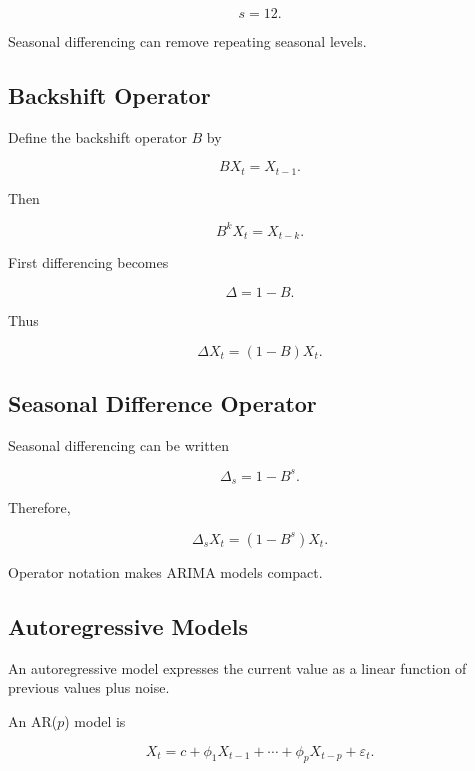 \[
\boxed{
s=12.
}
\]

Seasonal differencing can remove repeating seasonal levels.

\subsection{Backshift Operator}
\label{subsec:backshift-operator}

Define the backshift operator \(B\) by

\[
\boxed{
BX_t
=
X_{t-1}.
}
\]

Then

\[
\boxed{
B^kX_t
=
X_{t-k}.
}
\]

First differencing becomes

\[
\boxed{
\Delta
=
1-B.
}
\]

Thus

\[
\boxed{
\Delta X_t
=
(1-B)X_t.
}
\]

\subsection{Seasonal Difference Operator}
\label{subsec:seasonal-backshift}

Seasonal differencing can be written

\[
\boxed{
\Delta_s
=
1-B^s.
}
\]

Therefore,

\[
\boxed{
\Delta_sX_t
=
(
1-B^s
)
X_t.
}
\]

Operator notation makes ARIMA models compact.

\subsection{Autoregressive Models}
\label{subsec:autoregressive-models}

An autoregressive model expresses the current value as a linear function
of previous values plus noise.

An AR(\(p\)) model is

\[
\boxed{
X_t
=
c
+
\phi_1X_{t-1}
+
\cdots
+
\phi_pX_{t-p}
+
\varepsilon_t.
}
\]

